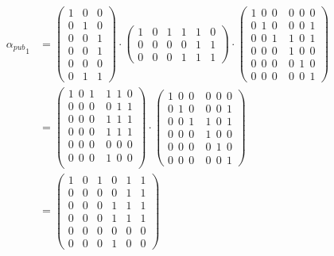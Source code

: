 \begin{equation}\label{eq:ej-alpha-pub-1}
	\begin{aligned}
	{{\alpha_{pub}}_1}  & =  
	\left(\begin{matrix}
		1 & 0 & 0\\
		0 & 1 & 0\\
		0 & 0 & 1\\
		\hline
		0 & 0 & 1\\
		0 & 0 & 0\\
		0 & 1 & 1
	\end{matrix}\right)
	\cdot
	\begin{pmatrix}
		1 & 0 & 1 & 1 & 1 & 0\\
		0 & 0 & 0 & 0 & 1 & 1\\
		0 & 0 & 0 & 1 & 1 & 1
	\end{pmatrix}
	\cdot
	\left(\begin{array}{c|c}
		1\ \ 0\ \ 0\ & 0\ \ 0\ \ 0\\
		0\ \ 1\ \ 0\ & 0\ \ 0\ \ 1\\
		0\ \ 0\ \ 1\ & 1\ \ 0\ \ 1\\
		\hline
		0\ \ 0\ \ 0\ & 1\ \ 0\ \ 0\\
		0\ \ 0\ \ 0\ & 0\ \ 1\ \ 0\\
		0\ \ 0\ \ 0\ & 0\ \ 0\ \ 1
	\end{array}\right) \\
	& = \left(\begin{array}{c|c}
		1\ \ 0\ \ 1\ & 1\ \ 1\ \ 0\\
		0\ \ 0\ \ 0\ & 0\ \ 1\ \ 1\\
		0\ \ 0\ \ 0\ & 1\ \ 1\ \ 1\\
		\hline
		0\ \ 0\ \ 0\ & 1\ \ 1\ \ 1\\
		0\ \ 0\ \ 0\ & 0\ \ 0\ \ 0\\
		0\ \ 0\ \ 0\ & 1\ \ 0\ \ 0\\
	\end{array}\right)
	\cdot
	\left(\begin{array}{c|c}
		1\ \ 0\ \ 0\ & 0\ \ 0\ \ 0\\
		0\ \ 1\ \ 0\ & 0\ \ 0\ \ 1\\
		0\ \ 0\ \ 1\ & 1\ \ 0\ \ 1\\
		\hline
		0\ \ 0\ \ 0\ & 1\ \ 0\ \ 0\\
		0\ \ 0\ \ 0\ & 0\ \ 1\ \ 0\\
		0\ \ 0\ \ 0\ & 0\ \ 0\ \ 1
	\end{array}\right)\\
	& = \begin{pmatrix}
		1 & 0 & 1 & 0 & 1 & 1\\
		0 & 0 & 0 & 0 & 1 & 1\\
		0 & 0 & 0 & 1 & 1 & 1\\
		0 & 0 & 0 & 1 & 1 & 1\\
		0 & 0 & 0 & 0 & 0 & 0\\
		0 & 0 & 0 & 1 & 0 & 0
	\end{pmatrix}
	\end{aligned}
\end{equation}

